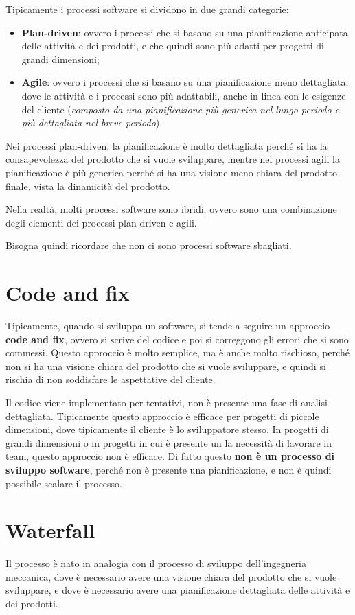 Tipicamente i processi software si dividono in due grandi categorie:
\begin{itemize}
    \item \textbf{Plan-driven}: ovvero i processi che si basano su una pianificazione
    anticipata delle attività e dei prodotti, e che quindi sono più adatti per progetti
    di grandi dimensioni;
    \item \textbf{Agile}: ovvero i processi che si basano su una pianificazione
    meno dettagliata, dove le attività e i processi sono più adattabili, anche in 
    linea con le esigenze del cliente (\textit{composto da una pianificazione più 
    generica nel lungo periodo e più dettagliata nel breve periodo}).
\end{itemize}
Nei processi plan-driven, la pianificazione è molto dettagliata perché si ha 
la consapevolezza del prodotto che si vuole sviluppare, mentre nei processi agili
la pianificazione è più generica perché si ha una visione meno chiara del prodotto
finale, vista la dinamicità del prodotto.
\begin{tcolorbox}
    Nella realtà, molti processi software sono ibridi, ovvero sono una combinazione
    degli elementi dei processi plan-driven e agili.

    Bisogna quindi ricordare che non ci sono processi software sbagliati.
\end{tcolorbox}
\section{Code and fix}
Tipicamente, quando si sviluppa un software, si tende a seguire un approccio
\textbf{code and fix}, ovvero si scrive del codice e poi si correggono gli errori
che si sono commessi. Questo approccio è molto semplice, ma è anche molto rischioso,
perché non si ha una visione chiara del prodotto che si vuole sviluppare, e quindi
si rischia di non soddisfare le aspettative del cliente.

Il codice viene implementato per tentativi, non è presente una fase di 
analisi dettagliata. Tipicamente questo approccio è efficace per progetti
di piccole dimensioni, dove tipicamente il cliente è lo sviluppatore stesso. In progetti 
di grandi dimensioni o in progetti in cui è presente un la necessità di lavorare 
in team, questo approccio non è efficace.
Di fatto questo \textbf{non è un processo di sviluppo software}, perché non è presente 
una pianificazione, e non è quindi possibile scalare il processo.
\section{Waterfall}
Il processo è nato in analogia con il processo di sviluppo dell'ingegneria
meccanica, dove è necessario avere una visione chiara del prodotto che si vuole
sviluppare, e dove è necessario avere una pianificazione dettagliata delle attività
e dei prodotti.

